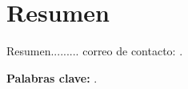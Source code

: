 %
%
%
% 
%
%
%
%

\chapter*{Resumen}
\label{cha:resumen}


Resumen......... correo de contacto: \contactauthor.

\textbf{Palabras clave:} \mybookpalabrasclave.



